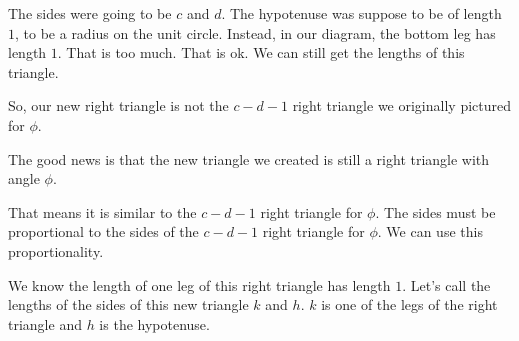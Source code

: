 \documentclass{ximera}
\begin{document}
The sides were going to be $c$ and $d$.  The hypotenuse was suppose to be of length $1$, to be a radius on the unit circle. Instead, in our diagram, the bottom leg has length $1$. That is too much.  That is ok. We can still get the lengths of this triangle.  

So, our new right triangle is not the $c-d-1$ right triangle we originally pictured for $\phi$. 


 The good news is that the new triangle we created is still a right triangle with angle $\phi$.  

 That means it is similar to the $c-d-1$ right triangle for $\phi$.  The sides must be proportional to the sides of the $c-d-1$ right triangle for $\phi$.  We can use this proportionality.

  We know the length of one leg of this right triangle has length $1$. Let's call the lengths of the sides of this new triangle $k$ and $h$.  $k$ is one of the legs of the right triangle and $h$ is the hypotenuse.
\end{document}
